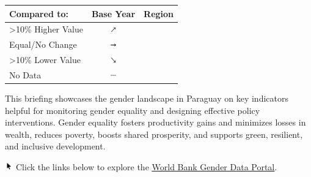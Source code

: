 \documentclass[
]{article}
\author{}
\date{\vspace{-2.5em}}
\begin{document}

\begin{table}\begingroup\fontsize{8}{10}\selectfont

\begin{tabular}[t]{lcl}

\textbf{Compared to:} & \textbf{Base Year} & \textbf{Region}\\
\midrule
>10\% Higher Value & \includegraphics[width=0.1in, height=0.1in]{upicon.png} & \cellcolor[HTML]{21908C}{}\\
Equal/No Change & \includegraphics[width=0.1in, height=0.1in]{righticon.png} & \cellcolor[HTML]{34608D}{}\\
>10\% Lower Value & \includegraphics[width=0.1in, height=0.1in]{downicon.png} & \cellcolor[HTML]{482576}{}\\
No Data & \includegraphics[width=0.1in, height=0.1in]{naicon.png} & \cellcolor{gray}{}\\

\end{tabular}
\endgroup{}\end{table}
\begin{minipage}[t][1.7cm][t]{12cm}
\fontsize{9}{8}\selectfont\raggedright
This briefing showcases the gender landscape in Paraguay on key indicators helpful for monitoring gender equality and designing effective policy interventions. Gender equality fosters productivity gains and minimizes losses in wealth, reduces poverty, boosts shared prosperity, and supports green, resilient, and inclusive development. 

\includegraphics[width=10pt]{pointer.png} Click the links below to explore the \underline{\href{https://genderdata.worldbank.org/}{World Bank Gender Data Portal}}.
\end{minipage}
\vspace{8pt}
\end{document}
